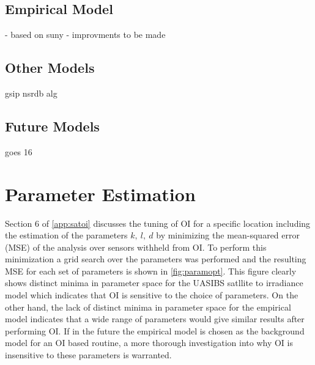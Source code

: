 \subsection{Empirical Model}
- based on suny
- improvments to be made

\subsection{Other Models}
gsip
nsrdb alg

\subsection{Future Models}
goes 16


\section{Parameter Estimation}
\label{sec:paramopt}
Section 6 of \cref{app:satoi} discusses the tuning of OI for a
specific location including the estimation of the parameters
$k,\: l,\: d$ by minimizing the mean-squared error (MSE) of the
analysis over sensors withheld from OI.
To perform this minimization a grid search over the parameters was
performed and the resulting MSE for each set of parameters is shown in
\cref{fig:paramopt}.
This figure clearly shows distinct minima in parameter space for the
UASIBS satllite to irradiance model which indicates that  OI is
sensitive to the choice of parameters.
On the other hand, the lack of distinct minima in parameter space for
the empirical model indicates that a wide range of parameters would
give similar results after performing OI.
If in the future the empirical model is chosen as the background model
for an OI based routine, a more thorough investigation into why OI is
insensitive to these parameters is warranted.


